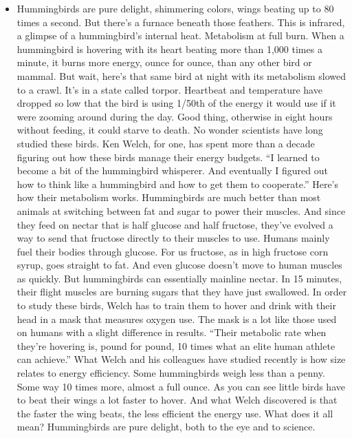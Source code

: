 \begin{itemize}
\tightlist
\item
  Hummingbirds are pure delight, shimmering colors, wings beating up to
  80 times a second. But there's a furnace beneath those feathers. This
  is infrared, a glimpse of a hummingbird's internal heat. Metabolism at
  full burn. When a hummingbird is hovering with its heart beating more
  than 1,000 times a minute, it burns more energy, ounce for ounce, than
  any other bird or mammal. But wait, here's that same bird at night
  with its metabolism slowed to a crawl. It's in a state called torpor.
  Heartbeat and temperature have dropped so low that the bird is using
  1/50th of the energy it would use if it were zooming around during the
  day. Good thing, otherwise in eight hours without feeding, it could
  starve to death. No wonder scientists have long studied these birds.
  Ken Welch, for one, has spent more than a decade figuring out how
  these birds manage their energy budgets. ``I learned to become a bit
  of the hummingbird whisperer. And eventually I figured out how to
  think like a hummingbird and how to get them to cooperate.'' Here's
  how their metabolism works. Hummingbirds are much better than most
  animals at switching between fat and sugar to power their muscles. And
  since they feed on nectar that is half glucose and half fructose,
  they've evolved a way to send that fructose directly to their muscles
  to use. Humans mainly fuel their bodies through glucose. For us
  fructose, as in high fructose corn syrup, goes straight to fat. And
  even glucose doesn't move to human muscles as quickly. But
  hummingbirds can essentially mainline nectar. In 15 minutes, their
  flight muscles are burning sugars that they have just swallowed. In
  order to study these birds, Welch has to train them to hover and drink
  with their head in a mask that measures oxygen use. The mask is a lot
  like those used on humans with a slight difference in results. ``Their
  metabolic rate when they're hovering is, pound for pound, 10 times
  what an elite human athlete can achieve.'' What Welch and his
  colleagues have studied recently is how size relates to energy
  efficiency. Some hummingbirds weigh less than a penny. Some way 10
  times more, almost a full ounce. As you can see little birds have to
  beat their wings a lot faster to hover. And what Welch discovered is
  that the faster the wing beats, the less efficient the energy use.
  What does it all mean? Hummingbirds are pure delight, both to the eye
  and to science.
\end{itemize}

